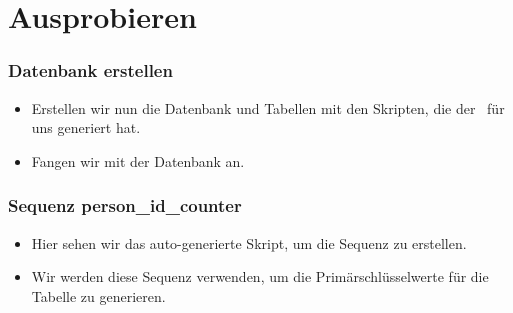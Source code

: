 \documentclass[aspectratio=169,mathserif,notheorems]{beamer}%
\begin{document}
\section{Ausprobieren}%

%
\begin{frame}[t]%
\frametitle{Datenbank erstellen}%
\begin{itemize}%
\item Erstellen wir nun die Datenbank und Tabellen mit den Skripten, die der \pgmodeler\ für uns generiert hat.%
%
\item<2-> Fangen wir mit der Datenbank an.
\end{itemize}%
%
%
%
\end{frame}%
%
\begin{frame}%
\frametitle{Sequenz person\_id\_counter}%
\parbox{0.435\linewidth}{\small%
\begin{itemize}%
%
\item Hier sehen wir das auto-generierte Skript, um die Sequenz zu erstellen.%
%
\item<2-> Wir werden diese Sequenz verwenden, um die Primärschlüsselwerte  für die Tabelle  zu generieren.%
\end{itemize}%
}%
%
\end{frame}%
%
\end{document}
